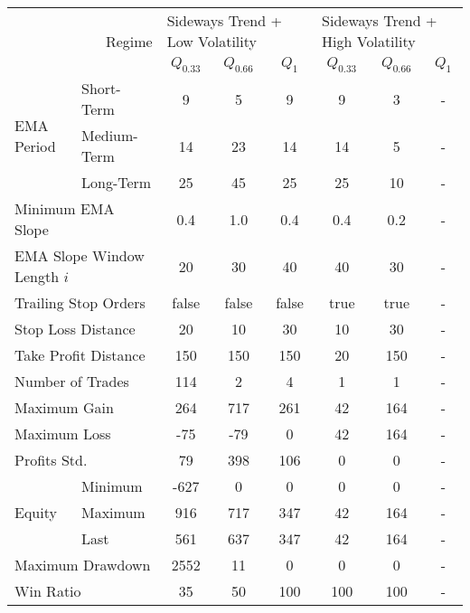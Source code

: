 \centering
\begin{tabular}{ll|cccccc}
    \toprule
    \multicolumn{2}{r|}{\multirow{2}{*}{Regime}} & \multicolumn{3}{l}{Sideways Trend + Low Volatility} & \multicolumn{3}{l}{Sideways Trend + High Volatility}  \\
    \multicolumn{2}{r|}{} & $Q_{0.33}$ & $Q_{0.66}$ & $Q_{1}$ & $Q_{0.33}$ & $Q_{0.66}$ & $Q_{1}$ \\
    \midrule
    \multirow{3}{*}{EMA Period} & Short-Term  & 9    & 5   & 9   & 9  & 3   & - \\
    & Medium-Term & 14   & 23  & 14  & 14 & 5   & - \\
    & Long-Term   & 25   & 45  & 25  & 25 & 10  & - \\
    \multicolumn{2}{l|}{Minimum EMA Slope} & 0.4 & 1.0 & 0.4 & 0.4 & 0.2 & - \\
    \multicolumn{2}{l|}{EMA Slope Window Length $i$} & 20 & 30 & 40 & 40 & 30 & - \\
    \multicolumn{2}{l|}{Trailing Stop Orders} & false & false & false & true & true & - \\
    \multicolumn{2}{l|}{Stop Loss Distance} & 20 & 10 & 30 & 10 & 30 & - \\
    \multicolumn{2}{l|}{Take Profit Distance} & 150 & 150 & 150 & 20 & 150 & - \\
    \midrule
    \multicolumn{2}{l|}{Number of Trades} & 114 & 2 & 4 & 1 & 1 & - \\
    \multicolumn{2}{l|}{Maximum Gain} & 264 & 717 & 261 & 42 & 164 & - \\
    \multicolumn{2}{l|}{Maximum Loss} & -75 & -79 & 0 & 42 & 164 & - \\
    \multicolumn{2}{l|}{Profits Std.} & 79 & 398 & 106 & 0 & 0 & - \\
    \multirow{3}{*}{Equity}     & Minimum     & -627 & 0   & 0   & 0  & 0   & - \\
    & Maximum     & 916  & 717 & 347 & 42 & 164 & - \\
    & Last        & 561  & 637 & 347 & 42 & 164 & - \\
    \multicolumn{2}{l|}{Maximum Drawdown} & 2552 & 11 & 0 & 0 & 0 & - \\
    \multicolumn{2}{l|}{Win Ratio} & 35 & 50 & 100 & 100 & 100 & - \\
    \bottomrule
\end{tabular}